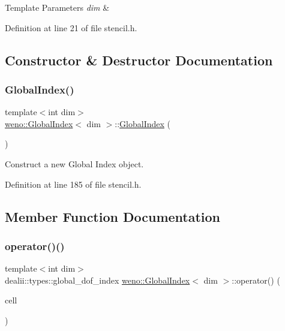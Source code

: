 \begin{DoxyTemplParams}{Template Parameters}
{\em dim} & \\
\hline
\end{DoxyTemplParams}


Definition at line 21 of file stencil.\+h.



\subsection{Constructor \& Destructor Documentation}
\mbox{\label{structweno_1_1_global_index_a49ed88c4dfeace6963df58483f1e0108}} 
\subsubsection{\texorpdfstring{Global\+Index()}{GlobalIndex()}}
{\footnotesize\ttfamily template$<$int dim$>$ \\
\hyperlink{structweno_1_1_global_index}{weno\+::\+Global\+Index}$<$ dim $>$\+::\hyperlink{structweno_1_1_global_index}{Global\+Index} (\begin{DoxyParamCaption}{ }\end{DoxyParamCaption})\hspace{0.3cm}{\ttfamily [inline]}}



Construct a new Global Index object. 



Definition at line 185 of file stencil.\+h.



\subsection{Member Function Documentation}
\mbox{\label{structweno_1_1_global_index_ad15a44ee69c4c7e8d786fbb2cb8f56ab}} 
\subsubsection{\texorpdfstring{operator()()}{operator()()}}
{\footnotesize\ttfamily template$<$int dim$>$ \\
dealii\+::types\+::global\+\_\+dof\+\_\+index \hyperlink{structweno_1_1_global_index}{weno\+::\+Global\+Index}$<$ dim $>$\+::operator() (\begin{DoxyParamCaption}\item[{const typename dealii\+::\+Do\+F\+Handler$<$ dim $>$\+::active\+\_\+cell\+\_\+iterator \&}]{cell }\end{DoxyParamCaption})\hspace{0.3cm}{\ttfamily [inline]}}



